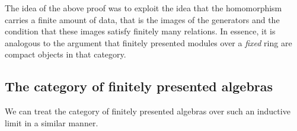\begin{remark} 
The idea of the above proof was to exploit the idea that the homomorphism
carries a finite amount of data, that is the images of the generators and the
condition that these images satisfy finitely many relations. In essence, it is
analogous to the argument that finitely presented modules over a \emph{fixed}
ring are compact objects in that category. 
\end{remark} 

\subsection{The category of finitely presented algebras}

We can treat the category of finitely presented algebras over such an
inductive limit in a similar manner. 


